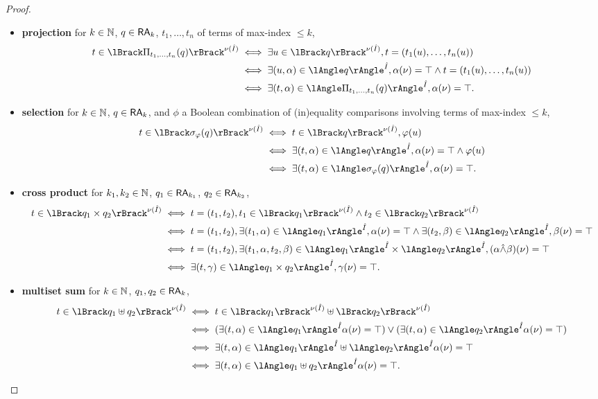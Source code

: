 \begin{proof}
\begin{itemize}
		\item \textbf{projection} for $k\in\mathbb{N}$, $q\in\mathsf{RA}_{k}$,
			$t_1,\dots, t_n$ of terms of max-index $\leq k$,
			\begin{align*}
				t\in\sem{\nu(\hat I)}{\Pi_{t_1,\dots,t_n}(q)}
				 & \iff
				\exists u\in \sem{\nu(\hat I)}{q}, t=(t_1(u),\dots,t_n(u))                             \\
				 & \iff
				\exists (u,\alpha)\in\ansem{\hat I}{q}, \alpha(\nu)=\top \land t=(t_1(u),\dots,t_n(u)) \\
				 & \iff
				\exists (t,\alpha)\in\ansem{\hat I}{\Pi_{t_1,\dots,t_n}(q)}, \alpha(\nu)=\top.
			\end{align*}
		\item \textbf{selection} for $k\in\mathbb{N}$, $q\in\mathsf{RA}_k$, and
			$\phi$ a Boolean combination of (in)equality comparisons involving terms
			of max-index $\leq k$,
			\begin{align*}
				t\in\sem{\nu(\hat I)}{\sigma_\phi(q)}
				 & \iff
				t\in\sem{\nu(\hat I)}{q}, \phi(u)                                   \\
				 & \iff
				\exists(t,\alpha)\in\ansem{\hat I}{q}, \alpha(\nu)=\top\land\phi(u) \\
				 & \iff
				\exists(t,\alpha)\in\ansem{\hat I}{\sigma_\phi(q)}, \alpha(\nu)=\top.
			\end{align*}
		\item \textbf{cross product} for $k_1,k_2\in\mathbb{N}$, $q_1\in\mathsf{RA}_{k_1}$,
			$q_2\in\mathsf{RA}_{k_2}$,
			\begin{align*}
				t\in\sem{\nu(\hat I)}{q_1\times q_2}
				 & \iff
				t=(t_1,t_2), t_1\in\sem{\nu(\hat I)}{q_1}\land t_2\in\sem{\nu(\hat I)}{q_2} \\
				 & \iff
				t=(t_1,t_2),
				\exists (t_1,\alpha)\in\ansem{\hat I}{q_1}, \alpha(\nu)=\top\land
				\exists(t_2,\beta)\in\ansem{\hat I}{q_2}, \beta(\nu)=\top                   \\
				 & \iff
				t=(t_1,t_2),
				\exists (t_1,\alpha,t_2,\beta)\in\ansem{\hat
				I}{q_1}\times\ansem{\hat I}{q_2}, (\alpha\hat\land\beta)(\nu)=\top          \\
				 & \iff
				\exists (t,\gamma)\in\ansem{\hat I}{q_1\times q_2}, \gamma(\nu)=\top.
			\end{align*}
		\item \textbf{multiset sum} for $k\in\mathbb{N}$, $q_1,q_2\in\mathsf{RA}_k$,
			\begin{align*}
				t\in \sem{\nu(\hat I)}{q_1\uplus q_2} & \iff
				t\in\sem{\nu(\hat I)}{q_1}\uplus\sem{\nu(\hat I)}{q_2}
				\\  & \iff
				(\exists(t,\alpha)\in\ansem{\hat
						I}{q_1}\alpha(\nu)=\top)\lor(\exists(t,\alpha)\in\ansem{\hat
						I}{q_2}\alpha(\nu)=\top)
				\\  & \iff
				\exists(t,\alpha)\in\ansem{\hat
					I}{q_1}\uplus\ansem{\hat I}{q_2}\alpha(\nu)=\top
				\\  & \iff
				\exists(t,\alpha)\in\ansem{\hat
					I}{q_1\uplus q_2}\alpha(\nu)=\top.
			\end{align*}


\end{itemize}
\end{proof}
